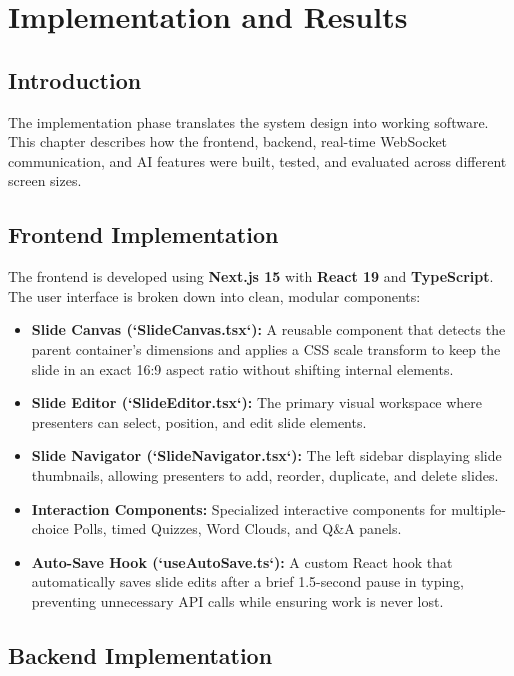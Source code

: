 \chapter{Implementation and Results}

\section{Introduction}

The implementation phase translates the system design into working software. This chapter describes how the frontend, backend, real-time WebSocket communication, and AI features were built, tested, and evaluated across different screen sizes.

\section{Frontend Implementation}

The frontend is developed using \textbf{Next.js 15} with \textbf{React 19} and \textbf{TypeScript}. The user interface is broken down into clean, modular components:

\begin{itemize}
    \item \textbf{Slide Canvas (`SlideCanvas.tsx`):} A reusable component that detects the parent container's dimensions and applies a CSS scale transform to keep the slide in an exact 16:9 aspect ratio without shifting internal elements.
    \item \textbf{Slide Editor (`SlideEditor.tsx`):} The primary visual workspace where presenters can select, position, and edit slide elements.
    \item \textbf{Slide Navigator (`SlideNavigator.tsx`):} The left sidebar displaying slide thumbnails, allowing presenters to add, reorder, duplicate, and delete slides.
    \item \textbf{Interaction Components:} Specialized interactive components for multiple-choice Polls, timed Quizzes, Word Clouds, and Q\&A panels.
    \item \textbf{Auto-Save Hook (`useAutoSave.ts`):} A custom React hook that automatically saves slide edits after a brief 1.5-second pause in typing, preventing unnecessary API calls while ensuring work is never lost.
\end{itemize}

\section{Backend Implementation}

